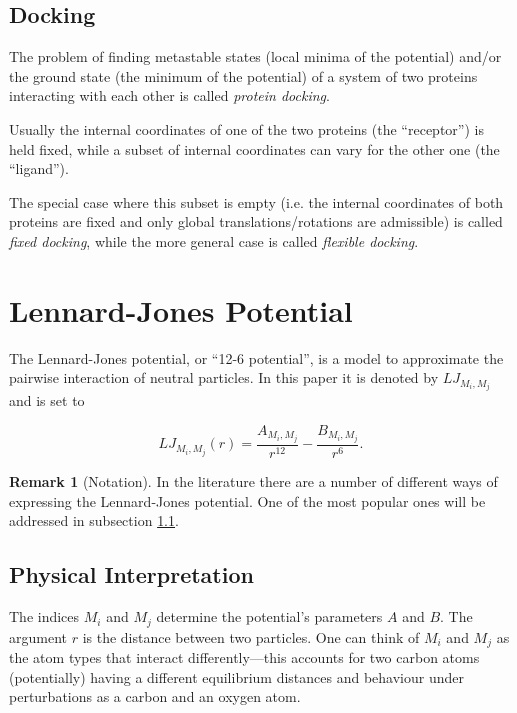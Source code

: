 \documentclass[12pt]{article}
\theoremstyle{definition}\newtheorem*{definition}{Definition}
\theoremstyle{definition}\newtheorem*{remark}{Remark}
\begin{document}
\subsection{Docking}\label{subsec:docking_def}
The problem of finding metastable states (local minima of the potential) and/or the ground state (the minimum of the potential) of a system of two proteins interacting with each other is called \textit{protein docking}.

Usually the internal coordinates of one of the two proteins (the ``receptor'') is held fixed, while a subset of internal coordinates can vary for the other one (the ``ligand'').

The special case where this subset is empty (i.e. the internal coordinates of both proteins are fixed and only global translations/rotations are admissible) is called \textit{fixed docking}, while the more general case is called \textit{flexible docking}.



\section{Lennard-Jones Potential}
The Lennard-Jones potential, or ``12-6 potential'', is a model to approximate the pairwise interaction of neutral particles. In this paper it is denoted by $LJ_{M_i,M_j}$ and is set to

$$LJ_{M_i,M_j}(r) = \frac{A_{M_i,M_j}}{r^{12}}-\frac{B_{M_i,M_j}}{r^6}.$$

\begin{remark}[Notation]
	In the literature there are a number of different ways of expressing the Lennard-Jones potential. One of the most popular ones will be addressed in  subsection \ref{subsec:LJ_interpretation}.
\end{remark}

\subsection{Physical Interpretation}\label{subsec:LJ_interpretation}
The indices $M_i$ and $M_j$ determine the potential's parameters $A$ and $B$. The argument $r$ is the distance between two particles. One can think of $M_i$ and $M_j$ as the atom types that interact differently---this accounts for two carbon atoms (potentially) having a different equilibrium distances and behaviour under perturbations as a carbon and an oxygen atom.
\end{document}
